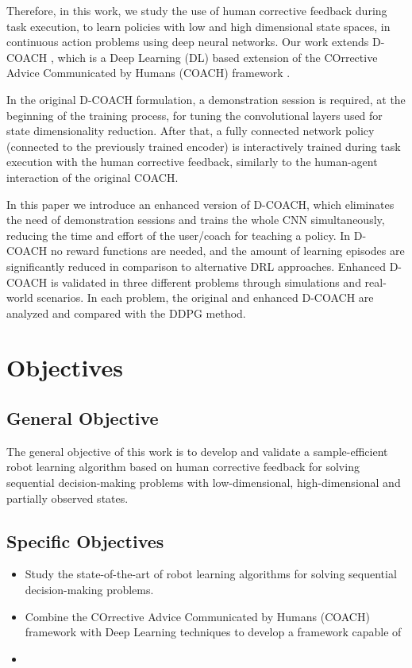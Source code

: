 \begin{intro}
Therefore, in this work, we study the use of human corrective feedback during task execution, to learn policies with low and high dimensional state spaces, in continuous action problems using deep neural networks. Our work extends D-COACH \cite{perez2018interactive}, which is a Deep Learning (DL) based extension of the COrrective Advice Communicated by Humans (COACH) framework \cite{Celemin2018AnInteractive}. 

In the original D-COACH formulation, a demonstration session is required, at the beginning of the training process, for tuning the convolutional layers used for state dimensionality reduction. After that, a fully connected network policy (connected to the previously trained encoder) is interactively trained during task execution with the human corrective feedback, similarly to the human-agent interaction of the original COACH.

In this paper we introduce an enhanced version of D-COACH, which eliminates the need of demonstration sessions and trains the whole CNN simultaneously, reducing the time and effort of the user/coach for teaching a policy.  In D-COACH no reward functions are needed, and the amount of learning episodes are significantly reduced in comparison to alternative DRL approaches. Enhanced D-COACH is validated in three different problems through simulations and real-world scenarios. In each problem, %
the original and enhanced D-COACH are analyzed and compared with the DDPG method. 


\section{Objectives}
\subsection{General Objective}
The general objective of this work is to develop and validate a sample-efficient robot learning algorithm based on human corrective feedback for solving sequential decision-making problems with low-dimensional, high-dimensional and partially observed states.

\subsection{Specific Objectives}

\begin{itemize}
    \item Study the state-of-the-art of robot learning algorithms for solving sequential decision-making problems.
    \item Combine the COrrective Advice Communicated by Humans (COACH) framework with Deep Learning techniques to develop a framework capable of 
    \item 
\end{itemize}


\end{intro}

